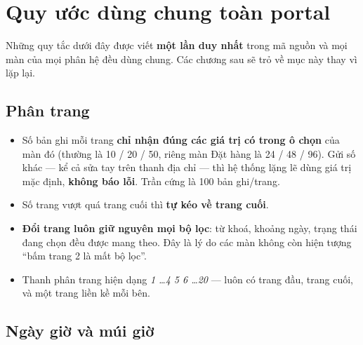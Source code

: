 \section{Quy ước dùng chung toàn portal}
\label{sec:quy-uoc-chung}

Những quy tắc dưới đây được viết \textbf{một lần duy nhất} trong mã nguồn và mọi màn của mọi
phân hệ đều dùng chung. Các chương sau sẽ trỏ về mục này thay vì lặp lại.

\subsection*{Phân trang}

\begin{itemize}[leftmargin=*]
  \item Số bản ghi mỗi trang \textbf{chỉ nhận đúng các giá trị có trong ô chọn} của màn đó
        (thường là 10 / 20 / 50, riêng màn Đặt hàng là 24 / 48 / 96). Gửi số khác --- kể cả sửa
        tay trên thanh địa chỉ --- thì hệ thống lặng lẽ dùng giá trị mặc định, \textbf{không
        báo lỗi}. Trần cứng là 100 bản ghi/trang.
  \item Số trang vượt quá trang cuối thì \textbf{tự kéo về trang cuối}.
  \item \textbf{Đổi trang luôn giữ nguyên mọi bộ lọc}: từ khoá, khoảng ngày, trạng thái đang
        chọn đều được mang theo. Đây là lý do các màn không còn hiện tượng ``bấm trang 2 là mất
        bộ lọc''.
  \item Thanh phân trang hiện dạng \emph{1 \ldots 4 5 6 \ldots 20} --- luôn có trang đầu, trang
        cuối, và một trang liền kề mỗi bên.
\end{itemize}

\subsection*{Ngày giờ và múi giờ}

